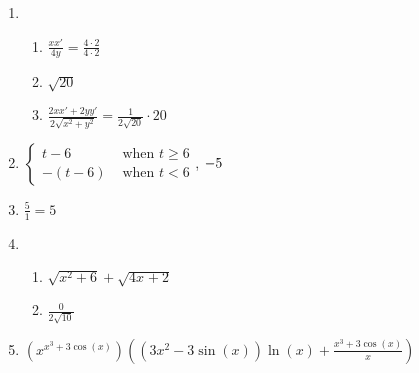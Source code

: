 \documentclass[12pt,twoside]{article}
\makeatletter
\def\emptycleardoublepage{\clearpage\if@twoside \ifodd\c@page\else
\thispagestyle{empty}%
\hbox{}\newpage\if@twocolumn\hbox{}\newpage\fi\fi\fi}
\makeatother
\begin{document}
\begin{multicols}{2}
\begin{enumerate}
\def \b{4}\def \x{4}\def \y{2}\def \xchange{2}\def \ratrhs{8}\def \cirrhs{32}\def \hyprhs{0}\def \compy{4y^{2}}\def \ychangenum{4}\def \dist{20}\def \fracrat{12}\def \fraccirc{12}\def \frachyp{20}
\item \begin{enumerate}
\item $\frac{xx'}{\b y} = \frac{\x \cdot \xchange}{\b \cdot \y}$
\item $\sqrt{\dist}$
\item $\frac{2xx'+2yy'}{2\sqrt{x^2+y^2}} = \frac{1}{2\sqrt{\dist}} \cdot \frachyp$
\end{enumerate}
\def \a{6}\def \k{5}\def \abstop{0}\def \ktop{1}
\item $\begin{cases} t-\a & \text{ when } t \geq \a \\ -(t- \a) & \text{ when } t < \a \end{cases}$, $\ifthenelse{\ktop=1}{-\k}{-\frac{1}{\k}}$
\def \a{4}\def \b{3}\def \k{5}\def \fancyp{x^{2}-7x^{}+12}\def \simplep{5x^{}-20}\def \fancyreduced{1}\def \niceanstop{\frac{1}{5}}\def \niceansbottom{5}
\item $\frac{\k}{\fancyreduced} = \niceansbottom$
\def \a{2}\def \b{2}\def \ab{4}\def \c{6}\def \amb{0}\def \ansroot{10}\def \firstroot{x^{2}+6}\def \secondroot{4x^{}+2}\def \porm{1}
\item \begin{enumerate}
\item $\sqrt{\firstroot} + \sqrt{\secondroot}$
\item $\frac{\amb}{2\sqrt{\ansroot}}$
\end{enumerate}
\def \varexp{3}\def \newexp{2}\def \trigcoeff{3}\def \trigval{+3}\def \oppval{-3}
\item $(x^{x^\varexp \trigval \cos(x)}) \left( (\varexp x^{\newexp} \oppval \sin(x))\ln(x) + \frac{x^\varexp \trigval \cos(x)}{x} \right)$
 \end{enumerate}\end{multicols}\emptycleardoublepage{}\graphicspath{{C:/Users/iainc/anaconda3/Randomizer/MATH 1001/Midterm 1/}}\begin{multicols}{2} \begin{enumerate}\def \a{-4}\def \b{9}\def \c{-1}\def \d{2}\def \negb{-9}\def \negc{1}\def \determ{1}\def \ansa{2}\def \ansb{-9}\def \ansc{1}\def \ansd{-4}

\end{enumerate}
\end{multicols}
\end{document}
